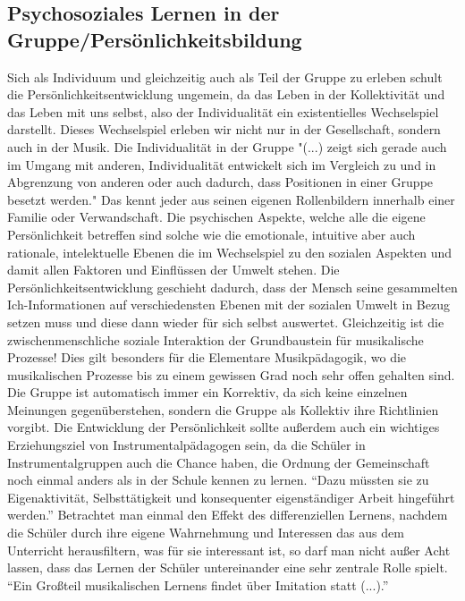 \subsection{Psychosoziales Lernen in der Gruppe/Persönlichkeitsbildung}
Sich als Individuum und gleichzeitig auch als Teil der Gruppe zu erleben schult
die Persönlichkeitsentwicklung ungemein, da das Leben in der Kollektivität und
das Leben mit uns selbst, also der Individualität ein existentielles
Wechselspiel darstellt. Dieses Wechselspiel erleben wir nicht nur in der
Gesellschaft, sondern auch in der Musik. Die Individualität in der Gruppe "(...)
zeigt sich gerade auch im Umgang mit anderen, Individualität entwickelt sich im
Vergleich zu und in Abgrenzung von anderen oder auch dadurch, dass Positionen in
einer Gruppe besetzt werden."
Das kennt jeder aus seinen eigenen Rollenbildern innerhalb einer Familie oder
Verwandschaft. Die psychischen Aspekte, welche alle die eigene Persönlichkeit
betreffen sind solche wie die emotionale, intuitive aber auch rationale,
intelektuelle Ebenen die im Wechselspiel zu den sozialen Aspekten und damit
allen Faktoren und Einflüssen der Umwelt stehen. Die Persönlichkeitsentwicklung
geschieht dadurch, dass der Mensch seine gesammelten Ich-Informationen auf
verschiedensten Ebenen mit der sozialen Umwelt in Bezug setzen muss und diese
dann wieder für sich selbst auswertet. Gleichzeitig ist die zwischenmenschliche
soziale Interaktion der Grundbaustein für musikalische Prozesse!
Dies gilt besonders für die Elementare Musikpädagogik, wo die musikalischen
Prozesse bis zu einem gewissen Grad noch sehr offen gehalten sind. Die Gruppe
ist automatisch immer ein Korrektiv, da sich keine einzelnen Meinungen
gegenüberstehen, sondern die Gruppe als Kollektiv ihre Richtlinien vorgibt. Die
Entwicklung der Persönlichkeit sollte außerdem auch ein wichtiges Erziehungsziel
von Instrumentalpädagogen sein, da die Schüler in Instrumentalgruppen auch die
Chance haben, die Ordnung der Gemeinschaft noch einmal anders als in der Schule
kennen zu lernen. \enquote{Dazu müssten sie zu Eigenaktivität, Selbsttätigkeit
und konsequenter eigenständiger Arbeit hingeführt
werden.}\autocite[64]{losert:die_kunst_zu_unterrichten} Betrachtet man einmal
den Effekt des differenziellen Lernens, nachdem die Schüler durch ihre eigene
Wahrnehmung und Interessen das aus dem Unterricht herausfiltern, was für sie
interessant ist, so darf man nicht außer Acht lassen, dass das Lernen der
Schüler untereinander eine sehr zentrale Rolle spielt. \enquote{Ein Großteil
musikalischen Lernens findet über Imitation statt
(...).}\autocite[98]{doerne:umfassend_musizieren}

